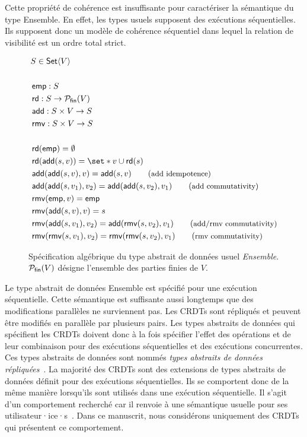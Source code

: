 Cette propriété de cohérence est insuffisante pour caractériser la sémantique du type Ensemble.
En effet, les types usuels supposent des exécutions séquentielles.
Ils supposent donc un modèle de cohérence séquentiel dans lequel la relation de visibilité est un ordre total strict.

\begin{figure}[tb]
    \centering
    \begin{align*}
    &S \in \trm{Set}\tuple*{V}\\
    &\\
    &\trm{emp}: S\\
    &\trm{rd}: S \to \powerfset{V}\\
    &\trm{add}: S \times V \to S\\
    &\trm{rmv}: S \times V \to S\\
    &\\
    &\trm{rd}(\trm{emp}) = \emptyset \\
    &\trm{rd}(\trm{add}(s, v)) = \set*{v} \cup \trm{rd}(s) \\
    &\trm{add}(\trm{add}(s, v), v) = \trm{add}(s, v) \tag{\small add idempotence}\\
    &\trm{add}(\trm{add}(s, v_1), v_2) = \trm{add}(\trm{add}(s, v_2), v_1) \tag{\small add commutativity}\\
    &\trm{rmv}(\trm{emp}, v) = \trm{emp}\\
    &\trm{rmv}(\trm{add}(s, v), v) = s\\
    &\trm{rmv}(\trm{add}(s, v_1), v_2) = \trm{add}(\trm{rmv}(s, v_2), v_1) \tag{\small add/rmv commutativity}\\
    &\trm{rmv}(\trm{rmv}(s, v_1), v_2) = \trm{rmv}(\trm{rmv}(s, v_2), v_1) \tag{\small rmv commutativity}\\
    \end{align*}
    \caption[Spécification algébrique du type abstrait \emph{Ensemble}]{Spécification algébrique du type abstrait de données usuel \emph{Ensemble}.
    $\mathcal{P}_{\mathsf{fin}} (V)$ désigne l'ensemble des parties finies de $V$.}\label{fig:set-spec}
\end{figure}

Le type abstrait de données Ensemble est spécifié pour une exécution séquentielle.
Cette sémantique est suffisante aussi longtemps que des modifications parallèles ne surviennent pas.
Les \acp{CRDT} sont répliqués et peuvent être modifiés en parallèle par plusieurs pairs.
Les types abstraits de données qui spécifient les \acp{CRDT} doivent donc à la fois spécifier l'effet des opérations et de leur combinaison pour des exécutions séquentielles et des exécutions concurrentes.
Ces types abstraits de données sont nommés \emph{types abstraits de données répliquées}~\autocite{roh_2011_rga}.
La majorité des \acp{CRDT} sont des extensions de types abstraits de données définit pour des exécutions séquentielles.
Ils se comportent donc de la même manière lorsqu'ils sont utilisés dans une exécution séquentielle.
Il s'agit d'un comportement recherché car il renvoie à une sémantique usuelle pour ses utilisateur·ice·s~\autocite{preguia2018_crdt}.
Dans ce manuscrit, nous considérons uniquement des \acp{CRDT} qui présentent ce comportement.

